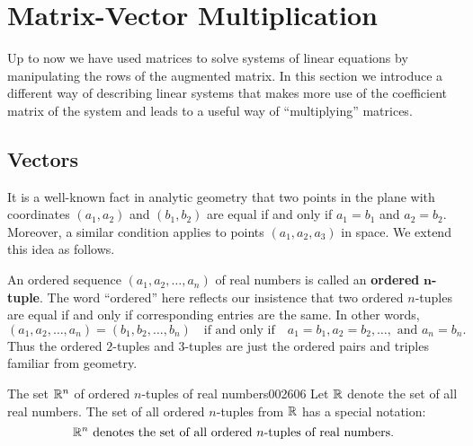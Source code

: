 \newpage
\section{Matrix-Vector Multiplication}
\label{sec:2_2}

Up to now we have used matrices to solve systems of linear equations by manipulating the rows of the augmented matrix. In this section we introduce a different way of describing linear systems that makes more use of the coefficient matrix of the system and leads to a useful way of ``multiplying'' matrices.


\subsection*{Vectors}


It is a well-known fact in analytic geometry that two points in the plane with coordinates $(a_{1}, a_{2})$ and $(b_{1}, b_{2})$ are equal if and only if $a_{1} = b_{1}$ and $a_{2} = b_{2}$. Moreover, a similar condition applies to points $(a_{1}, a_{2}, a_{3})$ in space. We extend this idea as follows.


An ordered sequence $(a_{1}, a_{2}, \dots, a_{n})$ of real numbers is called an \textbf{ordered} $\bm{n}$\textbf{-tuple}. The word ``ordered'' here reflects our insistence that two ordered $n$-tuples are equal if and only if corresponding entries are the same. In other words, 
\begin{equation*}
(a_{1}, a_{2}, \dots, a_{n}) = (b_{1}, b_{2}, \dots, b_{n}) \quad \mbox{if and only if} \quad a_{1} = b_{1}, a_{2} = b_{2}, \dots, \mbox{ and } a_{n} = b_{n}.
\end{equation*}
Thus the ordered $2$-tuples and $3$-tuples are just the ordered pairs and triples familiar from geometry.


\begin{definition}{The set $\mathbb{R}^n$ of ordered $n$-tuples of real numbers}{002606}
Let $\mathbb{R}$ denote the set of all real numbers. The set of {\normalfont all} ordered $n$-tuples from $\mathbb{R}$ has a special notation:
\begin{equation*}
\mathbb{R}^{n} \mbox{ denotes the set of all ordered }n\mbox{-tuples of real numbers.}
\end{equation*}
\end{definition}


